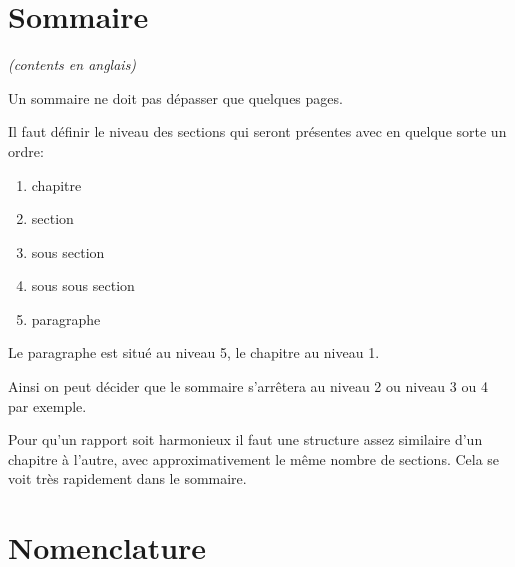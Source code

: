 \section{Sommaire }

\textit{(contents en anglais)}

Un sommaire ne doit pas dépasser que quelques pages. 

Il faut définir le niveau des sections qui seront présentes avec en quelque sorte un ordre:

\begin{enumerate}
\item chapitre
\item section
\item sous section
\item sous sous section
\item paragraphe
\end{enumerate}

Le paragraphe est situé au niveau 5, le chapitre au niveau 1.

Ainsi on peut décider que le sommaire s'arrêtera au niveau 2 ou niveau 3  ou 4 par exemple.



Pour qu'un rapport soit harmonieux il faut une structure assez similaire d'un chapitre à l'autre, avec approximativement le même nombre 
de sections. Cela se voit très rapidement dans le sommaire.


\section{Nomenclature}
\label{sec:nomenclature}

